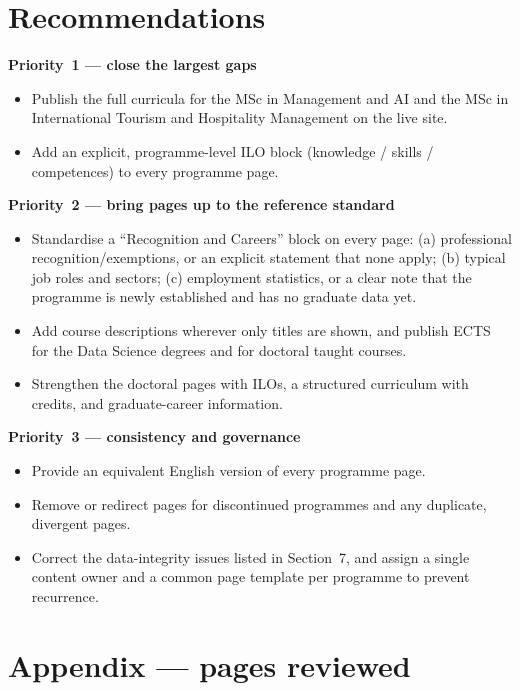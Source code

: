 \documentclass[11pt,a4paper]{article}
\begin{document}
\section{Recommendations}

\textbf{Priority~1 --- close the largest gaps}
\begin{itemize}
  \item Publish the full curricula for the MSc in Management and AI and the MSc in International Tourism and Hospitality Management on the live site.
  \item Add an explicit, programme-level ILO block (knowledge / skills / competences) to every programme page.
\end{itemize}

\textbf{Priority~2 --- bring pages up to the reference standard}
\begin{itemize}
  \item Standardise a ``Recognition and Careers'' block on every page: (a) professional recognition/exemptions, or an explicit statement that none apply; (b) typical job roles and sectors; (c) employment statistics, or a clear note that the programme is newly established and has no graduate data yet.
  \item Add course descriptions wherever only titles are shown, and publish ECTS for the Data Science degrees and for doctoral taught courses.
  \item Strengthen the doctoral pages with ILOs, a structured curriculum with credits, and graduate-career information.
\end{itemize}

\textbf{Priority~3 --- consistency and governance}
\begin{itemize}
  \item Provide an equivalent English version of every programme page.
  \item Remove or redirect pages for discontinued programmes and any duplicate, divergent pages.
  \item Correct the data-integrity issues listed in Section~7, and assign a single content owner and a common page template per programme to prevent recurrence.
\end{itemize}

\section*{Appendix --- pages reviewed}
\footnotesize
\end{document}
